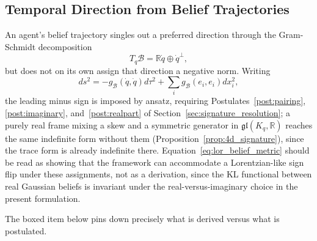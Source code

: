 \documentclass[11pt]{article}
\begin{document}
\subsection{Temporal Direction from Belief Trajectories}

An agent's belief trajectory singles out a preferred direction through the Gram-Schmidt decomposition
\begin{equation}
T_q\mathcal{B} = \mathbb{R}\dot{q} \oplus \dot{q}^\perp,
\label{eq:tangent_decomp}
\end{equation}
but does not on its own assign that direction a negative norm. Writing
\begin{equation}
ds^2 = -g_{\mathcal{B}}(\dot{q}, \dot{q}) d\tau^2 + \sum_i g_{\mathcal{B}}(e_i, e_i) dx_i^2,
\label{eq:lor_belief_metric}
\end{equation}
the leading minus sign is imposed by ansatz, requiring Postulates~\ref{post:pairing}, \ref{post:imaginary}, and~\ref{post:realpart} of Section~\ref{sec:signature_resolution}; a purely real frame mixing a skew and a symmetric generator in $\mathfrak{gl}(K_q,\mathbb{R})$ reaches the same indefinite form without them (Proposition~\ref{prop:4d_signature}), since the trace form is already indefinite there. Equation~\eqref{eq:lor_belief_metric} should be read as showing that the framework can accommodate a Lorentzian-like sign flip under these assignments, not as a derivation, since the KL functional between real Gaussian beliefs is invariant under the real-versus-imaginary choice in the present formulation.

The boxed item below pins down precisely what is derived versus what is postulated.
\end{document}
